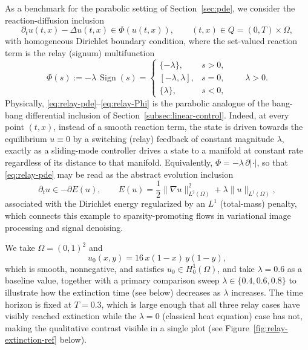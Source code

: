 \documentclass[11pt]{elsarticle}
\theoremstyle{definition}
\theoremstyle{remark}
\numberwithin{equation}{section}
\DeclareMathOperator{\Sign}{Sign}
\begin{document}
As a benchmark for the parabolic setting of Section~\ref{sec:pde},
we consider the reaction-diffusion inclusion
\begin{equation}
	\label{eq:relay-pde}
	\partial_t u(t,x) - \Delta u(t,x) \in \Phi(u(t,x)),
	\qquad (t,x)\in Q = (0,T)\times\Omega,
\end{equation}
with homogeneous Dirichlet boundary condition, where
the set-valued reaction term is the relay (signum) multifunction
\begin{equation}
	\label{eq:relay-Phi}
	\Phi(s) := -\lambda\,\Sign(s)
	=
	\begin{cases}
		\{-\lambda\}, & s>0,\\[2pt]
		[-\lambda,\lambda], & s=0,\\[2pt]
		\{\lambda\}, & s<0,
	\end{cases}
	\qquad \lambda>0.
\end{equation}
Physically, \eqref{eq:relay-pde}--\eqref{eq:relay-Phi} is the parabolic
analogue of the bang-bang differential inclusion of
Section~\ref{subsec:linear-control}. Indeed, at every point $(t,x)$, instead of a
smooth reaction term, the state is driven towards the equilibrium $u\equiv0$
by a switching (relay) feedback of constant magnitude $\lambda$, exactly as
a sliding-mode controller drives a state to a manifold at constant rate
regardless of its distance to that manifold. Equivalently, $\Phi=-\lambda\,\partial|\cdot|$, so that \eqref{eq:relay-pde}
may be read as the abstract evolution inclusion
\begin{equation}
	\label{eq:relay-gradient-flow}
	\partial_t u \in -\partial E(u),
	\qquad
	E(u) = \frac12\|\nabla u\|_{L^2(\Omega)}^2 + \lambda\|u\|_{L^1(\Omega)},
\end{equation}
associated with the Dirichlet energy regularized by an $L^1$ (total-mass)
penalty, which connects this example to sparsity-promoting flows in
variational image processing and signal denoising.

We take $\Omega=(0,1)^2$ and
\begin{equation}
	\label{eq:relay-u0}
	u_0(x,y) = 16\,x(1-x)\,y(1-y),
\end{equation}
which is smooth, nonnegative, and satisfies $u_0\in H_0^1(\Omega)$, and take
$\lambda=0.6$ as a baseline value, together with a primary comparison sweep
$\lambda\in\{0.4,0.6,0.8\}$ to illustrate how the extinction time (see below)
decreases as $\lambda$ increases. The time horizon is fixed at $T=0.3$, which
is large enough that all three relay cases have visibly reached extinction while
the $\lambda=0$ (classical heat equation) case has not, making the qualitative
contrast visible in a single plot (see Figure~\ref{fig:relay-extinction-ref} below).
\end{document}

